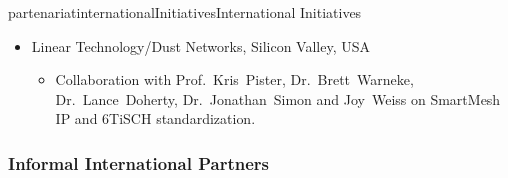 \documentclass{ra2016}
\begin{document}
\begin{module}{partenariat}{internationalInitiatives}{International Initiatives}
\begin{itemize}
\begin{itemize}
        \end{itemize}
    \item Linear Technology/Dust Networks, Silicon Valley, USA
        \begin{itemize}
            \item Collaboration with Prof.~Kris~Pister, Dr.~Brett~Warneke, Dr.~Lance~Doherty, Dr.~Jonathan~Simon and Joy~Weiss on SmartMesh IP and 6TiSCH standardization.
        \end{itemize}
\end{itemize}

%

\subsubsection{Informal International Partners}


\end{module}
\end{document}
